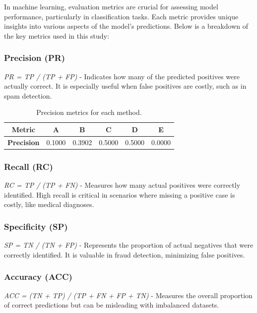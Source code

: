 \documentclass{llncs}
\begin{document}
In machine learning, evaluation metrics are crucial for assessing model performance, particularly in classification tasks. Each metric provides unique insights into various aspects of the model's predictions. Below is a breakdown of the key metrics used in this study:

\subsubsection{Precision (PR)}
\textit{PR = TP / (TP + FP)} - Indicates how many of the predicted positives were actually correct. It is especially useful when false positives are costly, such as in spam detection.

\begin{table}[h]
	\centering
	\begin{tabular}{|c|c|c|c|c|c|}
		\hline
		\textbf{Metric} & \textbf{A} & \textbf{B} & \textbf{C} & \textbf{D} & \textbf{E} \\ 
		\hline
		\textbf{Precision} & 0.1000 & 0.3902 & 0.5000 & 0.5000 & 0.0000 \\ 
		\hline
	\end{tabular}
	\caption{Precision metrics for each method.}
	\label{tab:precision}
\end{table}

\vspace{-20pt} %

\subsubsection{Recall (RC)}
\textit{RC = TP / (TP + FN)} - Measures how many actual positives were correctly identified. High recall is critical in scenarios where missing a positive case is costly, like medical diagnoses.

\subsubsection{Specificity (SP)}
\textit{SP = TN / (TN + FP)} - Represents the proportion of actual negatives that were correctly identified. It is valuable in fraud detection, minimizing false positives.

\subsubsection{Accuracy (ACC)}
\textit{ACC = (TN + TP) / (TP + FN + FP + TN)} - Measures the overall proportion of correct predictions but can be misleading with imbalanced datasets.
\end{document}
